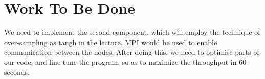 \documentclass{article}
\begin{document}
\section{Work To Be Done}
We need to implement the second component, which will employ the technique of over-sampling as taugh in the lecture.
MPI would be used to enable communication between the nodes. After doing this, we need to optimise parts of our 
code, and fine tune the program, so as to maximize the throughput in 60 seconds.
\end{document}
